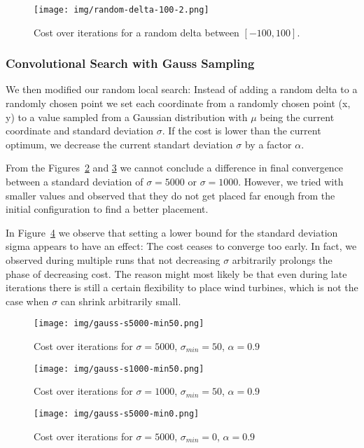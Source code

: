 \documentclass{article}
\begin{document}
\begin{figure}[h]
    \texttt{[image: img/random-delta-100-2.png]}
    \centering
    \caption{Cost over iterations for a random delta between $[-100,100]$.}
    \label{random}
\end{figure}


\subsubsection{Convolutional Search with Gauss Sampling}
We then modified our random local search: Instead of adding a random delta to a randomly chosen point we set each coordinate from a randomly chosen point (x, y) to a value sampled from a Gaussian distribution with $\mu$ being the current coordinate and standard deviation $\sigma$. If the cost is lower than the current optimum, we decrease the current standart deviation $\sigma$ by a factor $\alpha$.

From the Figures~\ref{s5000-min} and \ref{s1000-min} we cannot conclude a difference in final convergence between a standard deviation of $\sigma=5000$ or $\sigma=1000$. However, we tried with smaller values and observed that they do not get placed far enough from the initial configuration to find a better placement.

In Figure~\ref{s5000-no-min} we observe that setting a lower bound for the standard deviation sigma appears to have an effect: The cost ceases to converge too early. In fact, we observed during multiple runs that not decreasing $\sigma$ arbitrarily prolongs the phase of decreasing cost. The reason might most likely be that even during late iterations there is still a certain flexibility to place wind turbines, which is not the case when $\sigma$ can shrink arbitrarily small.

\begin{figure}[h]
    \texttt{[image: img/gauss-s5000-min50.png]}
    \centering
    \caption{Cost over iterations for $\sigma=5000$, $\sigma_{min}=50$, $\alpha=0.9$}
    \label{s5000-min}
\end{figure}

\begin{figure}[h]
    \texttt{[image: img/gauss-s1000-min50.png]}
    \centering
    \caption{Cost over iterations for $\sigma=1000$, $\sigma_{min}=50$, $\alpha=0.9$}
    \label{s1000-min}
\end{figure}

\begin{figure}[h]
    \texttt{[image: img/gauss-s5000-min0.png]}
    \centering
    \caption{Cost over iterations for $\sigma=5000$, $\sigma_{min}=0$, $\alpha=0.9$}
    \label{s5000-no-min}
\end{figure}
\end{document}
